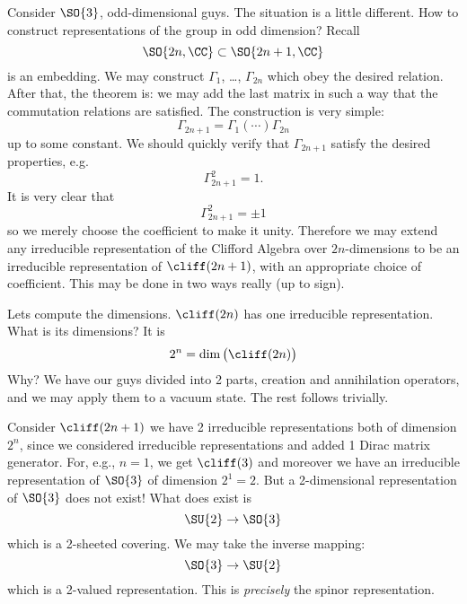 Consider $\SO{3}$, odd-dimensional guys. The situation is a
little different. How to construct representations of the group
in odd dimension? Recall
\begin{equation}
\SO{2n,\CC}\subset\SO{2n+1,\CC}
\end{equation}
is an embedding. We may construct $\Gamma_{1}$, \dots,
$\Gamma_{2n}$ which obey the desired relation. After that, the
theorem is: we may add the last matrix in such a way that the
commutation relations are satisfied. The construction is very
simple:
\begin{equation}
\Gamma_{2n+1} = \Gamma_{1}(\cdots)\Gamma_{2n}
\end{equation}
up to some constant. We should quickly verify that
$\Gamma_{2n+1}$ satisfy the desired properties, e.g.
\begin{equation}
\Gamma_{2n+1}^{2} = 1.
\end{equation}
It is very clear that
\begin{equation}
\Gamma_{2n+1}^{2}=\pm 1
\end{equation}
so we merely choose the coefficient to make it unity. Therefore
we may extend any irreducible representation of the Clifford
Algebra over $2n$-dimensions to be an irreducible representation
of $\cliff(2n+1)$, with an appropriate choice of
coefficient. This may be done in two ways really (up to sign).

Lets compute the dimensions. $\cliff(2n)$ has one irreducible
representation. What is its dimensions? It is
\begin{equation}
2^{n} = \dim\big(\cliff(2n)\big)
\end{equation}
Why? We have our guys divided into 2 parts, creation and
annihilation operators, and we may apply them to a vacuum
state. The rest follows trivially.

Consider $\cliff(2n+1)$ we have 2 irreducible representations
both of dimension $2^{n}$, since we considered irreducible
representations and added 1 Dirac matrix generator. For, e.g.,
$n=1$, we get $\cliff(3)$ and moreover we have an irreducible
representation of $\SO{3}$ of dimension $2^{1}=2$. But a
2-dimensional representation of $\SO{3}$ does not exist! What
does exist is
\begin{equation}
\SU{2}\to\SO{3}
\end{equation}
which is a 2-sheeted covering. We may take the inverse
mapping:
\begin{equation}
\SO{3}\to\SU{2}
\end{equation}
which is a 2-valued representation. This is \emph{precisely} the
spinor representation.

